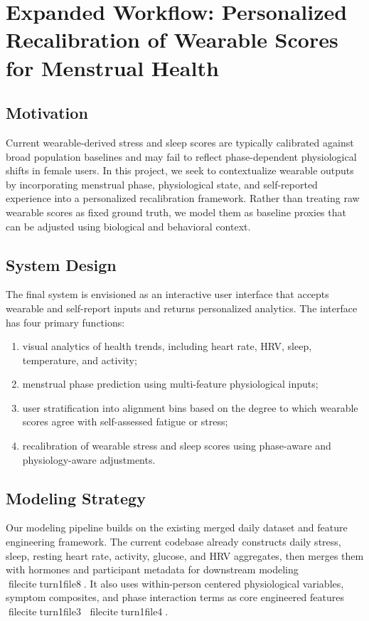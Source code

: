 \section{Expanded Workflow: Personalized Recalibration of Wearable Scores for Menstrual Health}

\subsection{Motivation}
Current wearable-derived stress and sleep scores are typically calibrated against broad population baselines and may fail to reflect phase-dependent physiological shifts in female users. In this project, we seek to contextualize wearable outputs by incorporating menstrual phase, physiological state, and self-reported experience into a personalized recalibration framework. Rather than treating raw wearable scores as fixed ground truth, we model them as baseline proxies that can be adjusted using biological and behavioral context.

\subsection{System Design}
The final system is envisioned as an interactive user interface that accepts wearable and self-report inputs and returns personalized analytics. The interface has four primary functions:
\begin{enumerate}
    \item visual analytics of health trends, including heart rate, HRV, sleep, temperature, and activity;
    \item menstrual phase prediction using multi-feature physiological inputs;
    \item user stratification into alignment bins based on the degree to which wearable scores agree with self-assessed fatigue or stress;
    \item recalibration of wearable stress and sleep scores using phase-aware and physiology-aware adjustments.
\end{enumerate}

\subsection{Modeling Strategy}
Our modeling pipeline builds on the existing merged daily dataset and feature engineering framework. The current codebase already constructs daily stress, sleep, resting heart rate, activity, glucose, and HRV aggregates, then merges them with hormones and participant metadata for downstream modeling fileciteturn1file8. It also uses within-person centered physiological variables, symptom composites, and phase interaction terms as core engineered features fileciteturn1file3 fileciteturn1file4.

